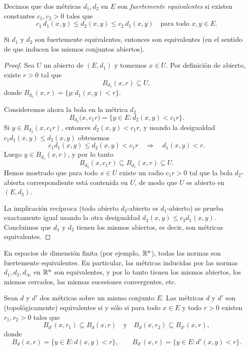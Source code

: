 \begin{defi}
Decimos que dos métricas $d_1,d_2$ en $E$ son \emph{fuertemente
equivalentes} si existen constantes $c_1,c_2 > 0$ tales que
\[
c_1\, d_1(x,y) \le d_2(x,y) \le c_2\, d_1(x,y)
\quad \text{para todo } x,y \in E.
\]
\end{defi}

\begin{prop}
Si $d_1$ y $d_2$ son fuertemente equivalentes, entonces son
equivalentes (en el sentido de que inducen los mismos conjuntos abiertos).
\end{prop}

\begin{proof}
Sea $U$ un abierto de $(E,d_1)$ y tomemos $x \in U$.
Por definición de abierto, existe $r>0$ tal que
\[
B_{d_1}(x,r) \subseteq U,
\]
donde $B_{d_1}(x,r) = \{y : d_1(x,y) < r\}$.

Consideremos ahora la bola en la métrica $d_2$
\[
B_{d_2}\bigl(x, c_1 r\bigr)
= \{y \in E : d_2(x,y) < c_1 r\}.
\]
Si $y \in B_{d_2}(x,c_1 r)$, entonces $d_2(x,y) < c_1 r$, y usando
la desigualdad $c_1 d_1(x,y) \le d_2(x,y)$ obtenemos
\[
c_1 d_1(x,y) \le d_2(x,y) < c_1 r
\quad\Longrightarrow\quad
d_1(x,y) < r.
\]
Luego $y \in B_{d_1}(x,r)$, y por lo tanto
\[
B_{d_2}(x,c_1 r) \subseteq B_{d_1}(x,r) \subseteq U.
\]
Hemos mostrado que para todo $x \in U$ existe un radio $c_1 r>0$ tal que
la bola $d_2$-abierta correspondiente está contenida en $U$, de modo que
$U$ es abierto en $(E,d_2)$.

La implicación recíproca (todo abierto $d_2$-abierto es $d_1$-abierto)
se prueba exactamente igual usando la otra desigualdad
$d_2(x,y) \le c_2 d_1(x,y)$. Concluimos que $d_1$ y $d_2$ tienen los mismos
abiertos, es decir, son métricas equivalentes.
\end{proof}

\begin{obs}
En espacios de dimensión finita (por ejemplo, $\mathbb{R}^n$), todas las normas
son fuertemente equivalentes. En particular, las métricas inducidas
por las normas $d_1,d_2,d_\infty$ en $\mathbb{R}^n$ son equivalentes, y por lo tanto
tienen los mismos abiertos, los mismos cerrados, las mismas sucesiones
convergentes, etc.
\end{obs}

\begin{teo}
Sean $d$ y $d'$ dos métricas sobre un mismo conjunto $E$.
Las métricas $d$ y $d'$ son (topológicamente) equivalentes si y sólo si
para todo $x \in E$ y todo $r>0$ existen $r_1,r_2>0$ tales que
\[
B_{d'}(x,r_1) \subseteq B_d(x,r)
\quad\text{y}\quad
B_d(x,r_2) \subseteq B_{d'}(x,r),
\]
donde
\[
B_d(x,r) = \{y \in E : d(x,y) < r\},
\qquad
B_{d'}(x,r) = \{y \in E : d'(x,y) < r\}.
\]
\end{teo}

